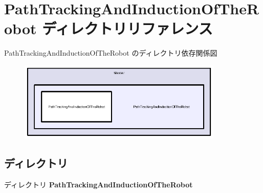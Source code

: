 \section{Path\-Tracking\-And\-Induction\-Of\-The\-Robot ディレクトリリファレンス}
\label{dir_3890cccb326c0ee1b484a4cf99bcc311}
Path\-Tracking\-And\-Induction\-Of\-The\-Robot のディレクトリ依存関係図\nopagebreak
\begin{figure}[H]
\begin{center}
\leavevmode
\includegraphics[width=277pt]{dir_3890cccb326c0ee1b484a4cf99bcc311_dep}
\end{center}
\end{figure}
\subsection*{ディレクトリ}
\begin{DoxyCompactItemize}
\item 
ディレクトリ {\bf Path\-Tracking\-And\-Induction\-Of\-The\-Robot}
\end{DoxyCompactItemize}
